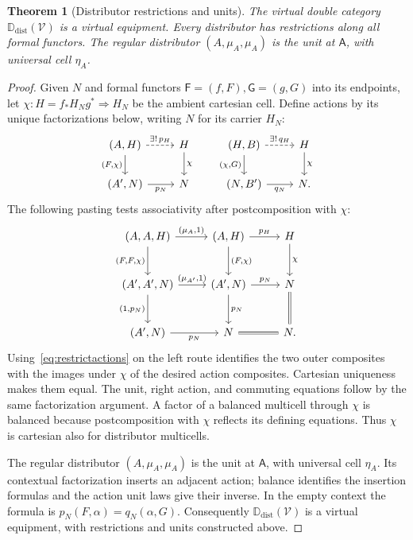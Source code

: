 \documentclass[11pt,a4paper]{article}
\newtheorem{theorem}{Theorem}[section]
\theoremstyle{definition}
\theoremstyle{remark}
\numberwithin{equation}{section}
\newcommand{\V}{\mathcal V}
\newcommand{\cell}{\mathrel{\Longrightarrow}}
\newcommand{\Ddist}{\mathbb D_{\mathrm{dist}}}
\begin{document}
\begin{theorem}[Distributor restrictions and units]\label{thm:restrictions}
The virtual double category $\Ddist(\V)$ is a virtual equipment.
Every distributor has restrictions along all formal functors. The
regular distributor $(A,\mu_A,\mu_A)$ is the unit at $\mathsf A$, with
universal cell $\eta_A$.
\end{theorem}
\begin{proof}
Given $N$ and formal
functors $\mathsf F=(f,F),\mathsf G=(g,G)$ into its endpoints, let
$\chi:H=f_*H_Ng^*\cell H_N$ be the ambient cartesian cell. Define actions
by its unique factorizations below, writing $N$ for its carrier $H_N$:
\begin{equation}\label{eq:restrictactions}
\begin{tikzcd}
(A,H) \arrow[r,dashed,"\exists!\,p_H"]
  \arrow[d,"{(F,\chi)}"'] &
H \arrow[d,"\chi"]\\
(A',N) \arrow[r,"p_N"'] & N
\end{tikzcd}
\qquad
\begin{tikzcd}
(H,B) \arrow[r,dashed,"\exists!\,q_H"]
  \arrow[d,"{(\chi,G)}"'] &
H \arrow[d,"\chi"]\\
(N,B') \arrow[r,"q_N"'] & N.
\end{tikzcd}
\end{equation}
The following pasting tests associativity after postcomposition with $\chi$:
\[
\begin{tikzcd}[column sep=2.5em,row sep=2.6em]
(A,A,H) \arrow[r,"{(\mu_A,1)}"] \arrow[d,"{(F,F,\chi)}"'] &
(A,H) \arrow[r,"p_H"] \arrow[d,"{(F,\chi)}"] &
H \arrow[d,"\chi"]\\
(A',A',N) \arrow[r,"{(\mu_{A'},1)}"]
  \arrow[d,"{(1,p_N)}"'] &
(A',N) \arrow[r,"p_N"] \arrow[d,"p_N"] &
N \arrow[d,equal]\\
(A',N) \arrow[r,"p_N"'] & N \arrow[r,equal] & N.
\end{tikzcd}
\]
Using~\eqref{eq:restrictactions} on the left route identifies the two
outer composites with the images under $\chi$ of the desired action
composites. Cartesian uniqueness makes them equal.
The unit, right action, and commuting equations follow by the same
factorization argument. A factor of a balanced multicell through $\chi$
is balanced because postcomposition with $\chi$ reflects its defining
equations. Thus $\chi$ is cartesian also for distributor multicells.

The regular distributor $(A,\mu_A,\mu_A)$ is the unit at $\mathsf A$,
with universal cell $\eta_A$. Its contextual factorization inserts an
adjacent action; balance identifies the insertion formulas and the
action unit laws give their inverse. In the empty context the formula is
$p_N(F,\alpha)=q_N(\alpha,G)$. Consequently $\Ddist(\V)$ is a virtual
equipment, with restrictions and units constructed above.
\end{proof}
\end{document}
